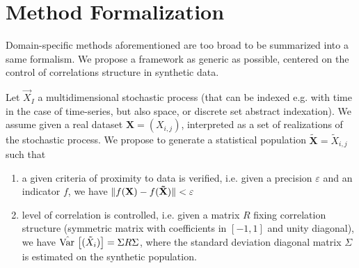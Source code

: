 \section{Method Formalization}

Domain-specific methods aforementioned are too broad to be summarized into a same formalism. We propose a framework as generic as possible, centered on the control of correlations structure in synthetic data.

Let $\vec{X}_I$ a multidimensional stochastic process (that can be indexed e.g. with time in the case of time-series, but also space, or discrete set abstract indexation). We assume given a real dataset $\mathbf{X}=(X_{i,j})$, interpreted as a set of realizations of the stochastic process. We propose to generate a statistical population $\mathbf{\tilde{X}}=\tilde{X}_{i,j}$ such that
\begin{enumerate}
\item a given criteria of proximity to data is verified, i.e. given a precision $\varepsilon$ and an indicator $f$, we have $\| f(\mathbf{X})-f(\mathbf{\tilde{X}}) \| < \varepsilon$
\item level of correlation is controlled, i.e. given a matrix $R$ fixing correlation structure (symmetric matrix with coefficients in $[-1,1]$ and unity diagonal), we have $\hat{\operatorname{Var}{}}\left[(\tilde{X}_i)\right] = \Sigma R \Sigma$, where the standard deviation diagonal matrix $\Sigma$ is estimated on the synthetic population.
\end{enumerate}


